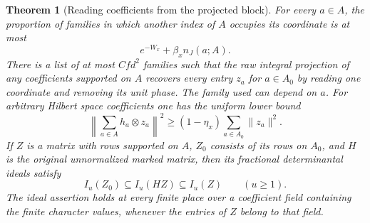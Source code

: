 \documentclass[a4paper,11pt]{article}
\newtheorem{theorem}[proposition]{Theorem}
\theoremstyle{definition}
\theoremstyle{remark}
\numberwithin{equation}{section}
\begin{document}
\begin{theorem}[Reading coefficients from the projected block]
\leavevmode\label{thm:localrecovery632}
For every \(a\in A\), the proportion of families in which another
index of \(A\) occupies its coordinate is at most
\[
                      e^{-W_x}+\beta_x n_J(a;A).
\]
There is a list of at most \(Cfd^2\) families such that the raw
integral projection of any coefficients supported on \(A\) recovers
every entry \(z_a\) for \(a\in A_0\) by reading one coordinate and
removing its unit phase. The family used can depend on \(a\). For
arbitrary Hilbert space coefficients one has the uniform lower bound
\[
    \left\|\sum_{a\in A}h_a\otimes z_a\right\|^2
                    \ge (1-\eta_x)\sum_{a\in A_0}\|z_a\|^2 .
\]
If \(Z\) is a matrix with rows supported on \(A\), \(Z_0\) consists
of its rows on \(A_0\), and \(H\) is the original unnormalized
marked matrix, then its fractional determinantal ideals satisfy
\[
                 I_u(Z_0)\subseteq I_u(HZ)\subseteq I_u(Z)
                 \qquad (u\ge1).
\]
The ideal assertion holds at every finite place over a coefficient
field containing the finite character values, whenever the entries of
\(Z\) belong to that field.
\end{theorem}
\end{document}
